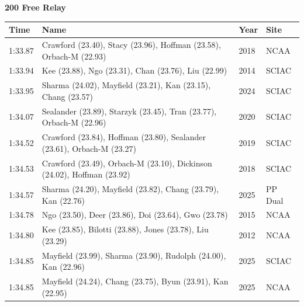 \vspace{1.2em}
\noindent\begin{minipage}[t]{0.98\textwidth}
\centering
\textbf{\textcolor{teamprimary}{200 Free Relay}}\par
\vspace{0.5em}
\centering
\small
\renewcommand{\arraystretch}{1.0}
\setlength{\tabcolsep}{4pt}
\begin{tabular}{@{}p{2.7cm}p{4.3cm}p{1.6cm}p{2.7cm}@{}}
\toprule
\textbf{Time} & \textbf{Name} & \textbf{Year} & \textbf{Site} \\
\midrule
1:33.87 & Crawford (23.40), Stacy (23.96), Hoffman (23.58), Orbach-M (22.93) & 2018 & NCAA \\
1:33.94 & Kee (23.88), Ngo (23.31), Chan (23.76), Liu (22.99) & 2014 & SCIAC \\
1:33.95 & Sharma (24.02), Mayfield (23.21), Kan (23.15), Chang (23.57) & 2024 & SCIAC \\
1:34.07 & Sealander (23.89), Starzyk (23.45), Tran (23.77), Orbach-M (22.96) & 2020 & SCIAC \\
1:34.52 & Crawford (23.84), Hoffman (23.80), Sealander (23.61), Orbach-M (23.27) & 2019 & SCIAC \\
1:34.53 & Crawford (23.49), Orbach-M (23.10), Dickinson (24.02), Hoffman (23.92) & 2018 & SCIAC \\
1:34.57 & Sharma (24.20), Mayfield (23.82), Chang (23.79), Kan (22.76) & 2025 & PP Dual \\
1:34.78 & Ngo (23.50), Deer (23.86), Doi (23.64), Gwo (23.78) & 2015 & NCAA \\
1:34.80 & Kee (23.85), Bilotti (23.88), Jones (23.78), Liu (23.29) & 2012 & NCAA \\
1:34.85 & Mayfield (23.99), Sharma (23.90), Rudolph (24.00), Kan (22.96) & 2025 & SCIAC \\
1:34.85 & Mayfield (24.24), Chang (23.75), Byun (23.91), Kan (22.95) & 2025 & NCAA \\
\bottomrule
\end{tabular}
\end{minipage}
\vspace{1.2em}
